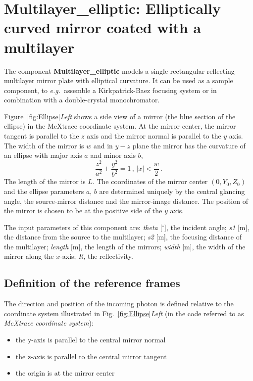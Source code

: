 \section{Multilayer\_elliptic: Elliptically curved mirror coated with a multilayer}
\label{s:mirror}



The component \textbf{Multilayer\_elliptic}
models a single rectangular reflecting multilayer mirror plate with elliptical curvature. It can be used
as a sample component, to \textit{e.g.}~assemble a Kirkpatrick-Baez focusing system 
or in combination with a double-crystal monochromator.


Figure~\ref{fig:Ellipse}\emph{Left} shows a side view of a mirror
(the blue section of the ellipse) in the McXtrace coordinate system.
At the mirror center, the mirror tangent is parallel to the $z$ axis
and the mirror normal is parallel to the $y$ axis. The width of the
mirror is $w$ and in $y-z$ plane the mirror has the curvature of an
ellipse with major axis $a$ and minor axis $b$,
%
\begin{equation} 
\frac{z^2}{ a^2} + \frac{y^2}{b^2} =1\,, \,|x| <
\frac{w}{2}\,.
\end{equation}
%
The length of the mirror is $L$. The coordinates of the mirror
center $(0,Y_0,Z_0)$ and the ellipse parameters $a$, $b$ are
determined uniquely by the central glancing angle, the source-mirror
distance and the mirror-image distance. The position of the mirror
is chosen to be at the positive side of the $y$ axis.

The input parameters of this component are:
\textit{theta} [$^{\circ}$], the incident angle; 
\textit{s1} [m], the distance from the source to the multilayer;
\textit{s2} [m], the focusing distance of the multilayer;
\textit{length} [m], the length of the mirrors;
\textit{width} [m], the width of the mirror along the $x$-axis;
\textit{R}, the reflectivity.

\subsection{Definition of the reference frames}
The direction and position of the incoming photon is defined
relative to the coordinate system illustrated in
Fig.~\ref{fig:Ellipse}\emph{Left} (in the code referred to as
\emph{McXtrace coordinate system}):
\begin{itemize}
\item the y-axis is parallel to the central mirror normal
\item the z-axis is parallel to the central mirror tangent
\item the origin is at the mirror center
\end{itemize}

